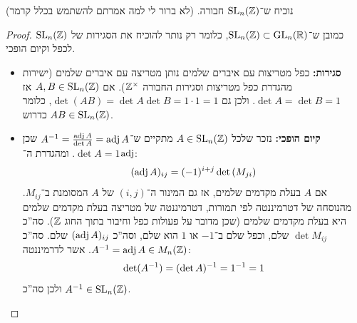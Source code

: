 \documentclass[]{../../../../../tex/classes/homework}
\begin{document}
	\section{}
	נוכיח ש־$\mathrm{SL}_n(\mathbb{Z})$ חבורה. (לא ברור לי למה אמרתם להשתמש בכלל קרמר)
	\begin{proof}
		כמובן ש־$\mathrm{SL}_n(\mathbb{Z}) \subset \mathrm{GL}_n(\mathbb{R})$, כלומר רק נותר להוכיח את הסגירות של $\mathrm{SL}_n(\mathbb{Z})$ לכפל וקיום הופכי. 
		\begin{itemize}
			\item \textbf{סגירות: }כפל מטריצות עם איברים שלמים נותן מטריצה עם איברים שלמים (ישירות מהגדרת כפל מטריצות וסגירות החבורה $\mathbb{Z}^{\times}$). אם $A, B \in \mathrm{SL}_n(\mathbb{Z})$ אז $\det A = \det B = 1$. ולכן גם $\det(AB) = \det A \det B = 1 \cdot 1 = 1$, כלומר $AB \in \mathrm{SL}_n(\mathbb{Z})$ כדרוש. 
			\item \textbf{קיום הופכי: }נזכר שלכל $A \in \mathrm{SL}_n(\mathbb{Z})$ מתקיים ש־$A ^{-1} = \frac{\operatorname{adj} A}{\det A} = \operatorname{adj} A$ שכן $\det A = 1$. ומהגדרת ה־$\operatorname{adj}$: 
			\[ (\operatorname{adj} A)_{ij} = (-1)^{i + j}\det\left ( M_{ji} \right ) \]
			אם $A$ בעלת מקדמים שלמים, אז גם המינור ה־$(i, j)$ של $A$ המסומנת ב־$M_{ij}$. מהנוסחה של דטרמיננטה לפי תמורות, דטרמיננטה של מטריצה בעלת מקדמים שלמים היא בעלת מקדמים שלמים (שכן מדובר על פעולות כפל וחיבור בתוך החוג $\mathbb{Z}$). סה''כ $\det M_{ij}$ שלם, וכפל שלם ב־$-1$ או $1$ הוא שלם, וסה''כ $(\operatorname{adj} A)_{ij}$ שלם. סה''כ $A^{-1} = \operatorname{adj} A\in M_n(\mathbb{Z})$. אשר לדרמיננטה: 
			\[ \det (A^{-1}) = (\det A)^{-1} = 1^{-1} = 1 \]
			ולכן סה''כ $A^{-1} \in \mathrm{SL}_n(\mathbb{Z})$. 
		\end{itemize}
	\end{proof}
	
	\ndoc
\end{document}

